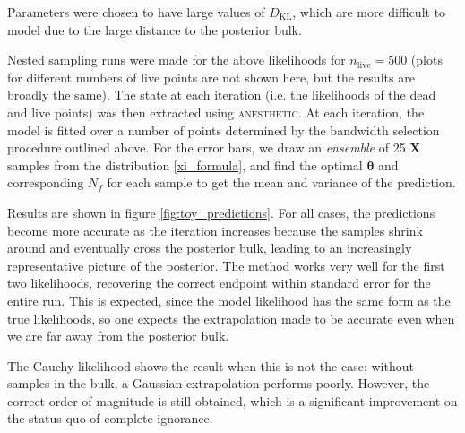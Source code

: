 \documentclass[usenatbib]{mnras}
\newcommand{\thetab}{\bm{\theta}}
\newcommand{\nlive}{n_\mathrm{live}}
\newcommand{\DKL}{D_\mathrm{KL}}
\begin{document}
Parameters were chosen to have large values of $\DKL$, which are more difficult to model due to the large distance to the posterior bulk.
\par
Nested sampling runs were made for the above likelihoods for $\nlive = 500$ (plots for different numbers of live points are not shown here, but the results are broadly the same). The state at each iteration (i.e. the likelihoods of the dead and live points) was then extracted using \textsc{anesthetic}. At each iteration, the model is fitted over a number of points determined by the bandwidth selection procedure outlined above. For the error bars, we draw an \textit{ensemble} of 25 $\bm{X}$ samples from the distribution \eqref{xi_formula}, and find the optimal $\thetab$ and corresponding  $N_f$ for each sample to get the mean and variance of the prediction. 
\par
Results are shown in figure \ref{fig:toy_predictions}. For all cases, the predictions become more accurate as the iteration increases because the samples shrink around and eventually cross the posterior bulk, leading to an increasingly representative picture of the posterior. The method works very well for the first two likelihoods, recovering the correct endpoint within standard error for the entire run. This is expected, since the model likelihood has the same form as the true likelihoods, so one expects the extrapolation made to be accurate even when we are far away from the posterior bulk.
\par
The Cauchy likelihood shows the result when this is not the case; without samples in the bulk, a Gaussian extrapolation performs poorly. However, the correct order of magnitude is still obtained, which is a significant improvement on the status quo of complete ignorance. 
\end{document}
